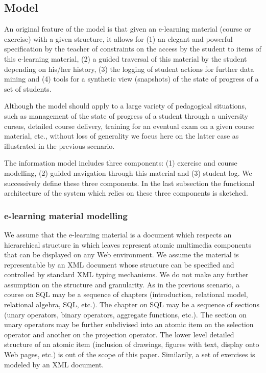 \subsection{Model}
An original feature of the model is that given an e-learning material
(course or exercise)
with a given structure, it allows for (1) an 
elegant and powerful specification by the teacher of constraints on
the access by the student to items of this e-learning material, (2) a
guided traversal of this material by the student depending on his/her
history, (3) the logging of student actions for further data mining
and (4) tools for a synthetic view (snapshots) of the state of
progress of a set of students.

Although the model should apply to a large variety of pedagogical
situations, such as management of the state of progress of a student
through a university cursus, detailed course delivery, training for an
eventual exam on a given course material, etc., without loss of
generality we focus here on the latter case as illustrated in the
previous scenario.

The information model includes three components: (1) exercise and
course modelling, (2) guided navigation through this material and (3)
student log. We successively define these three components. In the
last subsection the functional architecture of the system which relies
on these three components is sketched.


\subsubsection*{e-learning material modelling}
We assume that the e-learning material is a document which respects an
hierarchical structure in which leaves represent atomic multimedia
components that can be displayed on any Web environment. We assume the
material is representable by an XML document whose structure can be
specified and controlled by standard XML typing mechanisms. We do not
make any further assumption on the structure and granularity. As in the previous scenario,  a course on SQL may be a sequence of chapters (introduction,
relational model, relational algebra, SQL, etc.). The chapter on SQL
may be a sequence of sections (unary operators, binary operators,
aggregate functions, etc.). The section on unary operators may be further
subdivised into an atomic item on the selection operator and another
on the projection operator. The lower level detailed structure of an
atomic item (inclusion of drawings, figures with text, display onto
Web pages, etc.) is out of the scope of this paper.
Similarily, a set of exercises is modeled by an XML document. 

